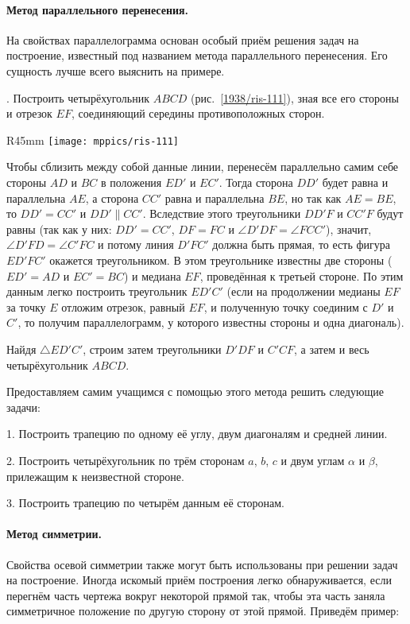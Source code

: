 \paragraph{Метод параллельного перенесения.}\label{1938/101}
На свойствах параллелограмма основан особый приём решения задач на построение, известный под названием метода параллельного перенесения.
Его сущность лучше всего выяснить на примере.

\smallskip
{}.
Построить четырёхугольник $ABCD$ (рис.~\ref{1938/ris-111}), зная все его стороны и отрезок $EF$, соединяющий середины противоположных сторон.

\begin{wrapfigure}{R}{45mm}
\centering
\texttt{[image: mppics/ris-111]}
\caption{}\label{1938/ris-111}
\end{wrapfigure}

Чтобы сблизить между собой данные линии, перенесём параллельно самим себе стороны $AD$ и $BC$ в положения $ED'$ и $EC'$.
Тогда сторона $DD'$ будет равна и параллельна $AE$, а сторона $CC'$ равна и параллельна $BE$, но так как $AE=BE$, то $DD'=CC'$ и $DD'\parallel CC'$.
Вследствие этого треугольники $DD'F$ и $CC'F$ будут равны (так как у них:
$DD' = CC'$, $DF=FC$ и $\angle D'DF=\angle FCC'$), значит, $\angle D'FD=\angle C'FC$ и потому линия $D'FC'$ должна быть прямая, то есть
фигура $ED'FC'$ окажется треугольником.
В этом треугольнике известны две стороны ($ED'=AD$ и $EC'=BC$) и медиана $EF$, проведённая к третьей стороне.
По этим данным легко построить треугольник $ED'C'$ (если на продолжении медианы $EF$ за точку $E$ отложим отрезок, равный $EF$, и полученную точку соединим с $D'$ и $C'$, то получим параллелограмм, у которого известны стороны и одна диагональ).

Найдя $\triangle ED'C'$, строим затем треугольники $D'DF$ и $C'CF$, а затем и весь четырёхугольник $ABCD$.

Предоставляем самим учащимся с помощью этого метода решить следующие задачи:

\medskip

1.
Построить трапецию по одному её углу, двум диагоналям и средней линии.

2.
Построить четырёхугольник по трём сторонам $a$, $b$, $c$ и двум углам $\alpha$ и $\beta$, прилежащим к неизвестной стороне.

3.
Построить трапецию по четырём данным её сторонам.


\paragraph{Метод симметрии.}\label{1938/102}
Свойства осевой симметрии также могут быть использованы при решении задач на построение.
Иногда искомый приём построения легко обнаруживается, если перегнём часть чертежа вокруг некоторой прямой так, чтобы эта часть заняла симметричное положение по другую сторону от этой прямой.
Приведём пример:

